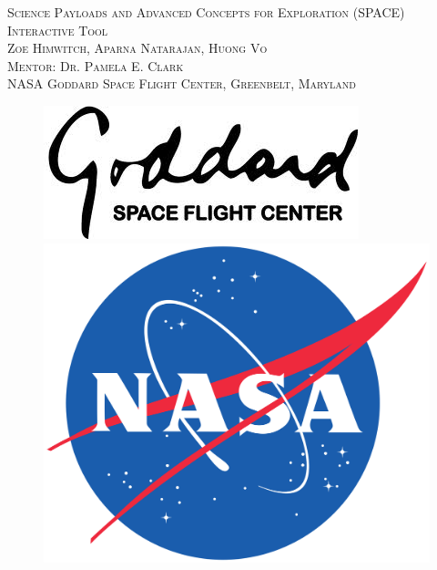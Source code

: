 \documentclass[a4, 12 pt]{article} %
\begin{document}
\begin{titlepage}
\newcommand{\HRule}{\rule{\linewidth}{0.5mm}} 
\centering

\textsc{\Large Science Payloads and Advanced Concepts for Exploration (SPACE) Interactive Tool \\[7mm] \normalsize Zoe Himwitch, Aparna Natarajan, Huong Vo\\[4mm] Mentor: Dr. Pamela E. Clark}\\[0.8cm] 
\textsc{NASA Goddard Space Flight Center, Greenbelt, Maryland}\\[124mm] 

\begin{figure}[h]
\centering
\begin{minipage}{.5\textwidth}
  \centering
  \includegraphics[width=1\linewidth, left]{goddard.jpg} %
\end{minipage}%
\begin{minipage}{.5\textwidth}
  \includegraphics[width=0.55\linewidth, right]{nasa.png} %
\end{minipage}
\end{figure}
\end{titlepage}

\tableofcontents
\newpage
\end{document}
